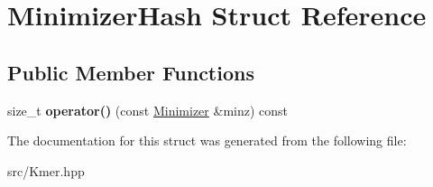 \hypertarget{structMinimizerHash}{}\section{Minimizer\+Hash Struct Reference}
\label{structMinimizerHash}
\subsection*{Public Member Functions}
\begin{DoxyCompactItemize}
\item 
\mbox{\label{structMinimizerHash_a52648a0dcc2c86e56b016b2d4277c261}} 
size\+\_\+t {\bfseries operator()} (const \hyperlink{classMinimizer}{Minimizer} \&minz) const
\end{DoxyCompactItemize}


The documentation for this struct was generated from the following file\+:\begin{DoxyCompactItemize}
\item 
src/Kmer.\+hpp\end{DoxyCompactItemize}
